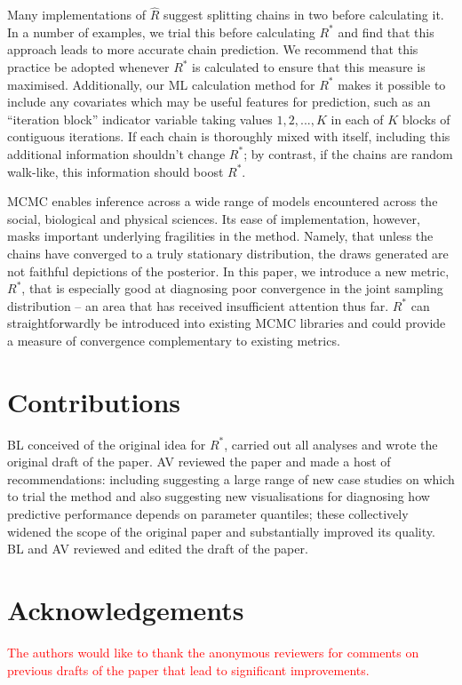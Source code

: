 \documentclass{article}
\begin{document}
Many implementations of $\widehat{R}$ suggest splitting chains in two before calculating it. In a number of examples, we trial this before calculating $R^*$ and find that this approach leads to more accurate chain prediction. We recommend that this practice be adopted whenever $R^*$ is calculated to ensure that this measure is maximised. Additionally, our ML calculation method for $R^*$ makes it possible to include any covariates which may be useful features for prediction, such as an ``iteration block'' indicator variable taking values $1, 2, ..., K$ in each of $K$ blocks of contiguous iterations. If each chain is thoroughly mixed with itself, including this additional information shouldn't change $R^*$; by contrast, if the chains are random walk-like, this information should boost $R^*$.

MCMC enables inference across a wide range of models encountered across the social, biological and physical sciences. Its ease of implementation, however, masks important underlying fragilities in the method. Namely, that unless the chains have converged to a truly stationary distribution, the draws generated are not faithful depictions of the posterior. In this paper, we introduce a new metric, $R^*$, that is especially good at diagnosing poor convergence in the joint sampling distribution -- an area that has received insufficient attention thus far. $R^*$ can straightforwardly be introduced into existing MCMC libraries and could provide a measure of convergence complementary to existing metrics.


\section{Contributions}
BL conceived of the original idea for $R^*$, carried out all analyses and wrote the original draft of the paper. AV reviewed the paper and made a host of recommendations: including suggesting a large range of new case studies on which to trial the method and also suggesting new visualisations for diagnosing how predictive performance depends on parameter quantiles; these collectively widened the scope of the original paper and substantially improved its quality. BL and AV reviewed and edited the draft of the paper.

\section{Acknowledgements}
\textcolor{red}{The authors would like to thank the anonymous reviewers for comments on previous drafts of the paper that lead to significant improvements.}


 


	
\end{document}

